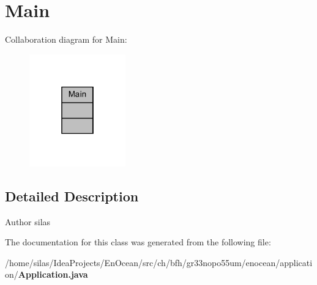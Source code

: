 \section{Main}
\label{classMain}


Collaboration diagram for Main\+:\nopagebreak
\begin{figure}[H]
\begin{center}
\leavevmode
\includegraphics[width=118pt]{d7/d2c/classMain__coll__graph}
\end{center}
\end{figure}


\subsection{Detailed Description}
\begin{DoxyAuthor}{Author}
silas 
\end{DoxyAuthor}


The documentation for this class was generated from the following file\+:\begin{DoxyCompactItemize}
\item 
/home/silas/\+Idea\+Projects/\+En\+Ocean/src/ch/bfh/gr33nopo55um/enocean/application/{\bf Application.\+java}\end{DoxyCompactItemize}
